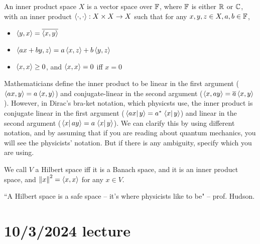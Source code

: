 \documentclass{article}
\begin{document}
\par
An inner product space $X$ is a vector space over $\mathbb{F}$, where $\mathbb{F}$ is either $\mathbb{R}$ or $\mathbb{C}$, with an inner product $\left\langle \cdot, \cdot \right\rangle: X \times X \rightarrow X$ such that for any $x,y,z \in X, a,b \in \mathbb{F}$,
\begin{itemize}
    \item $\left\langle y,x \right\rangle = \overline{\left\langle x, y \right\rangle}$
    \item $\left\langle ax+by, z \right\rangle = a \left\langle x,z \right\rangle+b\left\langle y,z \right\rangle$
    \item $\left\langle x, x \right\rangle \geq 0$, and $\left\langle x,x \right\rangle=0$ iff $x=0$
\end{itemize}
\begin{note}
    Mathematicians define the inner product to be linear in the first argument ($\left\langle ax,y \right\rangle=a\left\langle x,y \right\rangle$) and conjugate-linear in the second argument ($\left\langle x,ay \right\rangle=\overline{a}\left\langle x,y \right\rangle$). However, in Dirac's bra-ket notation, which physicsts use, the inner product is conjugate linear in the first argument ($ \left.\left\langle ax\right\vert y \right\rangle = a^* \left.\left\langle x\right\vert y \right\rangle$) and linear in the second argument ($ \left.\left\langle x\right\vert ay \right\rangle =a \left.\left\langle x\right\vert y \right\rangle$). We can clarify this by using different notation, and by assuming that if you are reading about quantum mechanics, you will see the physicists' notation. But if there is any ambiguity, specify which you are using.
\end{note}
\par
We call $V$ a Hilbert space iff it is a Banach space, and it is an inner product space, and $\left\lVert x\right\rVert^2=\left\langle x,x \right\rangle$ for any $x \in V$.
\begin{thm}
    ``A Hilbert space is a safe space -- it's where physicists like to be" -- prof. Hudson.
\end{thm}

\section{10/3/2024 lecture}
\end{document}
